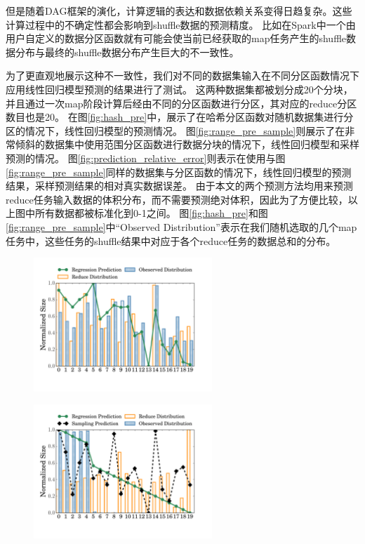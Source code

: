 但是随着DAG框架的演化，计算逻辑的表达和数据依赖关系变得日趋复杂。这些计算过程中的不确定性都会影响到shuffle数据的预测精度。
比如在Spark中一个由用户自定义的数据分区函数就有可能会使当前已经获取的map任务产生的shuffle数据分布与最终的shuffle数据分布产生巨大的不一致性。

为了更直观地展示这种不一致性，我们对不同的数据集输入在不同分区函数情况下应用线性回归模型预测的结果进行了测试。
这两种数据集都被划分成20个分块，并且通过一次map阶段计算后经由不同的分区函数进行分区，其对应的reduce分区数目也是20。
在图\ref{fig:hash_pre}中，展示了在哈希分区函数对随机数据集进行分区的情况下，线性回归模型的预测情况。
图\ref{fig:range_pre_sample}则展示了在非常倾斜的数据集中使用范围分区函数进行数据分块的情况下，线性回归模型和采样预测的情况。
图\ref{fig:prediction_relative_error}则表示在使用与图\ref{fig:range_pre_sample}同样的数据集与分区函数的情况下，线性回归模型的预测结果，采样预测结果的相对真实数据误差。
由于本文的两个预测方法均用来预测reduce任务输入数据的体积分布，而不需要预测绝对体积，因此为了方便比较，以上图中所有数据都被标准化到0-1之间。
图\ref{fig:hash_pre}和图\ref{fig:range_pre_sample}中“Observed Distribution”表示在我们随机选取的几个map任务中，这些任务的shuffle结果中对应于各个reduce任务的数据总和的分布。

\begin{figure}[!htp]
    \centering
    \includegraphics[width=0.6\textwidth]{../../PPoPP-2018/fig/hash_pre.pdf}
\end{figure}

\begin{figure}[!htp]
    \centering
	\includegraphics[width=0.6\textwidth]{../../PPoPP-2018/fig/range_pre_sample.pdf}
\end{figure}

